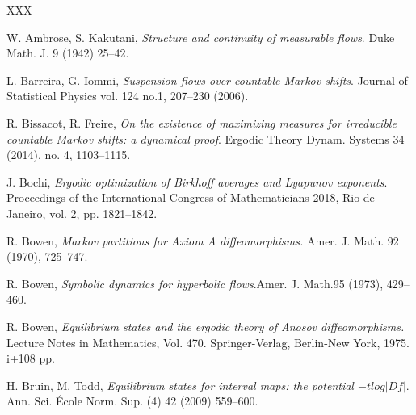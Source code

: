 \documentclass[letterpaper,11pt]{amsart}
\theoremstyle{plain}
\theoremstyle{plain}
\theoremstyle{definition}
\theoremstyle{remark}
\begin{document}
\begin{thebibliography}{XXX}

 W. Ambrose, S. Kakutani, \emph{Structure and continuity of measurable flows}. Duke Math. J. 9 (1942) 25--42.

 L. Barreira, G. Iommi, \emph{Suspension flows over countable Markov shifts}.  Journal of Statistical Physics vol. 124 no.1, 207--230 (2006).

 R. Bissacot, R. Freire, \emph{On the existence of maximizing measures for irreducible countable Markov shifts: a dynamical proof}. Ergodic Theory Dynam. Systems 34 (2014), no. 4, 1103--1115.

 J. Bochi, \emph{Ergodic optimization of Birkhoff averages and Lyapunov exponents}. Proceedings of the International Congress of Mathematicians 2018, Rio de Janeiro, vol. 2, pp. 1821--1842.

 R. Bowen, \emph{Markov partitions for Axiom A diffeomorphisms.} Amer. J. Math. 92 (1970), 725--747.



 R. Bowen, \emph{Symbolic dynamics for hyperbolic flows}.Amer. J. Math.95 (1973), 429--460.

 R. Bowen, \emph{Equilibrium states and the ergodic theory of Anosov diffeomorphisms.} Lecture Notes in Mathematics, Vol. 470. Springer-Verlag, Berlin-New York, 1975. i+108 pp.

 H. Bruin, M. Todd, \emph{Equilibrium states for interval maps: the potential $-t log|Df|$}. Ann. Sci. École Norm. Sup. (4) 42 (2009) 559--600.

 





\end{thebibliography}
\end{document}
